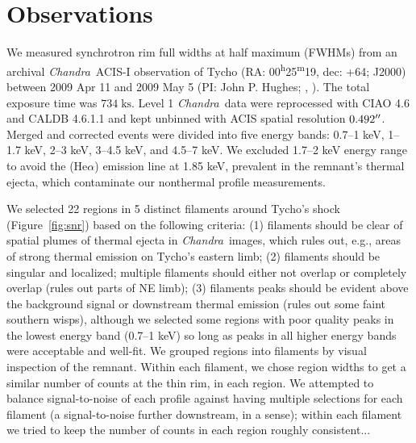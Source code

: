 \documentclass[iop, apj, numberedappendix, twocolappendix]{emulateapj}
\newcommand*{\mt}{\mathrm}
\newcommand*{\unit}[1]{\;\mt{#1}}  %
\newcommand*{\tsup}{\textsuperscript}
\newcommand*{\Chandra}{\textit{Chandra}\ }
\begin{document}
\section{Observations}
\label{sec:observations}

We measured synchrotron rim full widths at half maximum (FWHMs) from an
archival \Chandra ACIS-I observation of Tycho
(RA: 00\tsup{h}25\tsup{m}19, dec: +64; J2000)
between 2009 Apr 11 and 2009 May 5 (PI: John P. Hughes;
,
).
The total exposure time was $734 \unit{ks}$.
Level 1 \Chandra data were reprocessed with CIAO 4.6 and CALDB 4.6.1.1 and kept
unbinned with ACIS spatial resolution $0.492\mbox{$^{\prime\prime}$}$.
Merged and corrected events were divided into five energy bands:
0.7--1 keV, 1--1.7 keV, 2--3 keV, 3--4.5 keV, and 4.5--7 keV.
We excluded 1.7--2 keV energy range to avoid the  (He$\alpha$)
emission line at 1.85 keV, prevalent in the remnant's thermal ejecta, which
  
contaminate our nonthermal profile measurements.

We selected 22 regions in 5 distinct filaments around Tycho's shock
(Figure~\ref{fig:snr}) based on the following criteria: (1) filaments should be
clear of spatial plumes of thermal ejecta in \Chandra images, which rules out,
e.g., areas of strong thermal emission on Tycho's eastern limb; (2) filaments
should be singular and localized; multiple filaments should either not
overlap or completely overlap (rules out parts of NE limb); (3) filaments
peaks should be evident above the background signal or downstream thermal
emission (rules out some faint southern wisps), although we selected some
regions with poor quality peaks in the lowest energy band (0.7--1 keV) so long
as peaks in all higher energy bands were acceptable and well-fit.
We grouped regions into filaments by visual inspection of the remnant.
Within each filament, we chose region widths to get a similar number of counts
at the thin rim, in each region.
We attempted to balance signal-to-noise of each profile against having multiple
selections for each filament (a signal-to-noise further downstream, in a
sense); within each filament we tried to keep the number of counts in each
region roughly consistent... 
\end{document}
